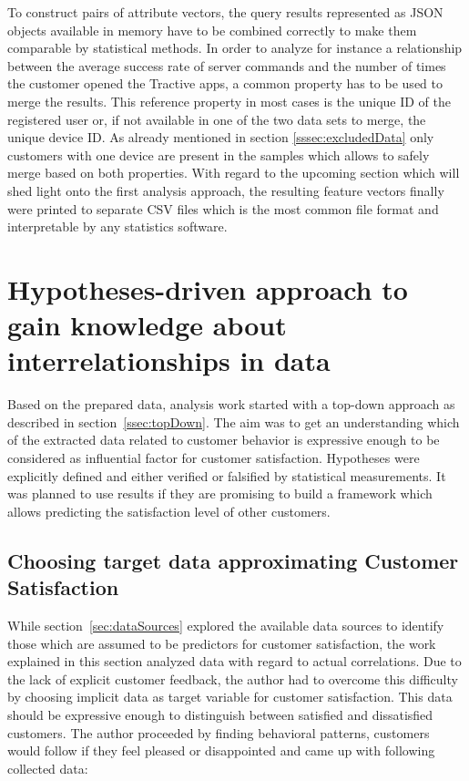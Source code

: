 To construct pairs of attribute vectors, the query results represented as JSON objects available in memory have to be combined correctly to make them comparable by statistical methods. In order to analyze for instance a relationship between the average success rate of server commands and the number of times the customer opened the Tractive apps, a common property has to be used to merge the results. This reference property in most cases is the unique ID of the registered user or, if not available in one of the two data sets to merge, the unique device ID. As already mentioned in section \ref{sssec:excludedData} only customers with one device are present in the samples which allows to safely merge based on both properties. With regard to the upcoming section which will shed light onto the first analysis approach, the resulting feature vectors finally were printed to separate CSV files which is the most common file format and interpretable by any statistics software.

\section{Hypotheses-driven approach to gain knowledge about interrelationships in data}
\label{sec:hypothesesDriven}
Based on the prepared data, analysis work started with a top-down approach as described in section~\ref{ssec:topDown}. The aim was to get an understanding which of the extracted data related to customer behavior is expressive enough to be considered as influential factor for customer satisfaction. Hypotheses were explicitly defined and either verified or falsified by statistical measurements. It was planned to use results if they are promising to build a framework which allows predicting the satisfaction level of other customers. 

\subsection{Choosing target data approximating Customer Satisfaction}
While section~\ref{sec:dataSources} explored the available data sources to identify those which are assumed to be predictors for customer satisfaction, the work explained in this section analyzed data with regard to actual correlations. Due to the lack of explicit customer feedback, the author had to overcome this difficulty by choosing implicit data as target variable for customer satisfaction. This data should be expressive enough to distinguish between satisfied and dissatisfied customers. The author proceeded by finding behavioral patterns, customers would follow if they feel pleased or disappointed and came up with following collected data:

